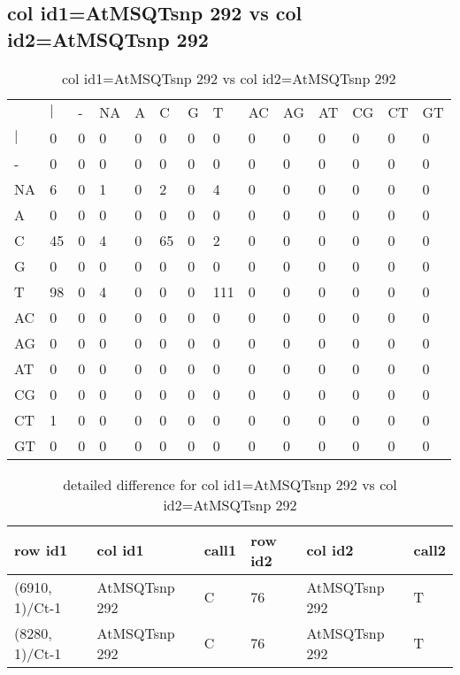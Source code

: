 \subsection{col id1=AtMSQTsnp 292 vs col id2=AtMSQTsnp 292}
\begin{center}
\begin{longtable}{|l|l|l|l|l|l|l|l|l|l|l|l|l|l|}
\caption{col id1=AtMSQTsnp 292 vs col id2=AtMSQTsnp 292} \label{table_dm834}\\
\hline
\\
\hline
&$|$&-&NA&A&C&G&T&AC&AG&AT&CG&CT&GT\\
$|$&0&0&0&0&0&0&0&0&0&0&0&0&0\\
-&0&0&0&0&0&0&0&0&0&0&0&0&0\\
NA&6&0&1&0&2&0&4&0&0&0&0&0&0\\
A&0&0&0&0&0&0&0&0&0&0&0&0&0\\
C&45&0&4&0&65&0&2&0&0&0&0&0&0\\
G&0&0&0&0&0&0&0&0&0&0&0&0&0\\
T&98&0&4&0&0&0&111&0&0&0&0&0&0\\
AC&0&0&0&0&0&0&0&0&0&0&0&0&0\\
AG&0&0&0&0&0&0&0&0&0&0&0&0&0\\
AT&0&0&0&0&0&0&0&0&0&0&0&0&0\\
CG&0&0&0&0&0&0&0&0&0&0&0&0&0\\
CT&1&0&0&0&0&0&0&0&0&0&0&0&0\\
GT&0&0&0&0&0&0&0&0&0&0&0&0&0\\
\hline
\end{longtable}
\end{center}

\begin{center}
\begin{longtable}{|l|l|l|l|l|l|}
\caption{detailed difference for col id1=AtMSQTsnp 292 vs col id2=AtMSQTsnp 292} \label{table_dm835}\\
\hline
row id1&col id1&call1&row id2&col id2&call2\\
\hline
(6910, 1)/Ct-1&AtMSQTsnp 292&C&76&AtMSQTsnp 292&T\\
(8280, 1)/Ct-1&AtMSQTsnp 292&C&76&AtMSQTsnp 292&T\\
\hline
\end{longtable}
\end{center}

